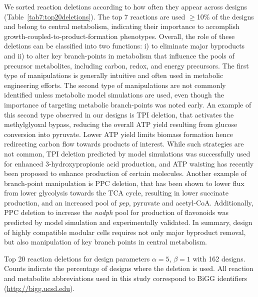 {We sorted reaction deletions according to how often they appear across designs (Table~\ref{tab7:top20deletions}).
The top 7 reactions are used $\ge$10\% of the designs and belong to central metabolism, indicating their importance to accomplish growth-coupled-to-product-formation phenotypes.
Overall, the role of these deletions can be classified into two functions: i) to eliminate major byproducts and ii) to alter key branch-points in metabolism that influence the pools of precursor metabolites, including carbon, redox, and energy precursors.
The first type of manipulations is generally intuitive and often used in metabolic engineering efforts.\citep{winkler2015}
The second type of manipulations are not commonly identified unless metabolic model simulations are used, \citep{tokuyama2014, venayak2018, chemler2010}
even though the importance of targeting metabolic branch-points was noted early. \citep{stephanopoulos1991}
An example of this second type observed in our designs is TPI deletion, that activates the methylglyoxal bypass,\citep{fong2006} reducing the overall ATP yield resulting from glucose conversion into pyruvate.
Lower ATP yield limits biomass formation hence redirecting carbon flow towards products of interest.
While such strategies are not common, TPI deletion predicted by model simulations was successfully used for enhanced 3-hydroxypropionic acid production,\citep{tokuyama2014} and ATP waisting has recently been proposed to enhance production of certain molecules.\citep{boecker2019}
Another example of branch-point manipulation is PPC deletion, that has been shown to lower flux from lower glycolysis towards the TCA cycle,\citep{de2006,peng2004} resulting in lower succinate production, and an increased pool of \textit{pep}, pyruvate and acetyl-CoA.
Additionally, PPC deletion to increase the \textit{nadph} pool for production of flavonoids was predicted by model simulation and experimentally validated. \citep{chemler2010}
In summary, design of highly compatible modular cells requires not only major byproduct removal, but also manipulation of key branch points in central metabolism.

\begin{table}[h]
    \caption[Top 20 reaction deletions for design parameters $\alpha=5$, $\beta=1$]{Top 20 reaction deletions for design parameters $\alpha=5$, $\beta=1$ with 162 designs. Counts indicate the percentage of designs where the deletion is used. All reaction and metabolite abbreviations used in this study correspond to BiGG identifiers (\protect\url{http://bigg.ucsd.edu}).}
    \centering
    
    \label{tab7:top20deletions}
\end{table}


}
